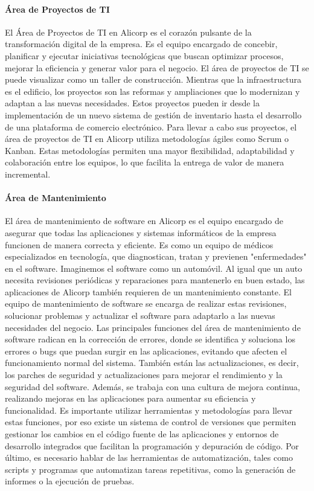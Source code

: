         \paragraph{Área de Proyectos de TI}
        El Área de Proyectos de TI en Alicorp es el corazón pulsante de la transformación digital de la empresa. Es el equipo encargado de concebir, planificar y ejecutar iniciativas tecnológicas que buscan optimizar procesos, mejorar la eficiencia y generar valor para el negocio. 
        El área de proyectos de TI se puede visualizar como un taller de construcción. Mientras que la infraestructura es el edificio, los proyectos son las reformas y ampliaciones que lo modernizan y adaptan a las nuevas necesidades. Estos proyectos pueden ir desde la implementación de un nuevo sistema de gestión de inventario hasta el desarrollo de una plataforma de comercio electrónico. 
        Para llevar a cabo sus proyectos, el área de proyectos de TI en Alicorp utiliza metodologías ágiles como Scrum o Kanban. Estas metodologías permiten una mayor flexibilidad, adaptabilidad y colaboración entre los equipos, lo que facilita la entrega de valor de manera incremental. 
    
        \paragraph{Área de Mantenimiento}
        El área de mantenimiento de software en Alicorp es el equipo encargado de asegurar que todas las aplicaciones y sistemas informáticos de la empresa funcionen de manera correcta y eficiente. Es como un equipo de médicos especializados en tecnología, que diagnostican, tratan y previenen "enfermedades" en el software. 
        Imaginemos el software como un automóvil. Al igual que un auto necesita revisiones periódicas y reparaciones para mantenerlo en buen estado, las aplicaciones de Alicorp también requieren de un mantenimiento constante. El equipo de mantenimiento de software se encarga de realizar estas revisiones, solucionar problemas y actualizar el software para adaptarlo a las nuevas necesidades del negocio. 
        Las principales funciones del área de mantenimiento de software radican en la corrección de errores, donde se identifica y soluciona los errores o bugs que puedan surgir en las aplicaciones, evitando que afecten el funcionamiento normal del sistema. También están las actualizaciones, es decir, los parches de seguridad y actualizaciones para mejorar el rendimiento y la seguridad del software. Además, se trabaja con una cultura de mejora continua, realizando mejoras en las aplicaciones para aumentar su eficiencia y funcionalidad. 
        Es importante utilizar herramientas y metodologías para llevar estas funciones, por eso existe un sistema de control de versiones que permiten gestionar los cambios en el código fuente de las aplicaciones y entornos de desarrollo integrados que facilitan la programación y depuración de código. Por último, es necesario hablar de las herramientas de automatización, tales como scripts y programas que automatizan tareas repetitivas, como la generación de informes o la ejecución de pruebas. 


